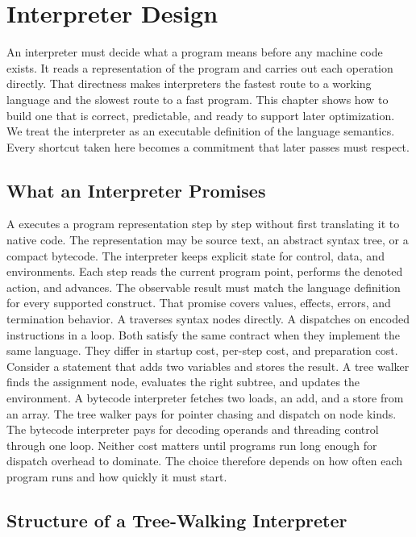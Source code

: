 \chapter{Interpreter Design}\label{ch:interpreter-design}

An interpreter must decide what a program means before any machine code exists.
It reads a representation of the program and carries out each operation directly.
That directness makes interpreters the fastest route to a working language and the slowest route to a fast program.
This chapter shows how to build one that is correct, predictable, and ready to support later optimization.
We treat the interpreter as an executable definition of the language semantics.
Every shortcut taken here becomes a commitment that later passes must respect.

\section{What an Interpreter Promises}\label{sec:ch30-promise}

A  executes a program representation step by step without first translating it to native code.
The representation may be source text, an abstract syntax tree, or a compact bytecode.
The interpreter keeps explicit state for control, data, and environments.
Each step reads the current program point, performs the denoted action, and advances.
The observable result must match the language definition for every supported construct.
That promise covers values, effects, errors, and termination behavior.
A  traverses syntax nodes directly.
A  dispatches on encoded instructions in a loop.
Both satisfy the same contract when they implement the same language.
They differ in startup cost, per-step cost, and preparation cost.
Consider a statement that adds two variables and stores the result.
A tree walker finds the assignment node, evaluates the right subtree, and updates the environment.
A bytecode interpreter fetches two loads, an add, and a store from an array.
The tree walker pays for pointer chasing and dispatch on node kinds.
The bytecode interpreter pays for decoding operands and threading control through one loop.
Neither cost matters until programs run long enough for dispatch overhead to dominate.
The choice therefore depends on how often each program runs and how quickly it must start.

\section{Structure of a Tree-Walking Interpreter}\label{sec:ch30-tree-walking}

